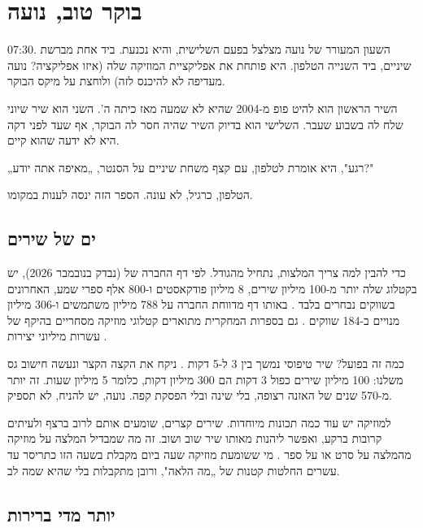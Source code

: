 
\chapter{בוקר טוב, נועה}\label{ch:1}

\begin{scene}
07:30. השעון המעורר של נועה מצלצל בפעם השלישית, והיא נכנעת. ביד אחת מברשת שיניים, ביד השנייה הטלפון. היא פותחת את אפליקציית המוזיקה שלה (איזו אפליקציה? נועה מעדיפה לא להיכנס לזה) ולוחצת על מיקס הבוקר.

השיר הראשון הוא להיט פופ מ-2004 שהיא לא שמעה מאז כיתה ה'. השני הוא שיר שיוני שלח לה בשבוע שעבר. השלישי הוא בדיוק השיר שהיה חסר לה הבוקר, אף שעד לפני דקה היא לא ידעה שהוא קיים.

„רגע", היא אומרת לטלפון, עם קצף משחת שיניים על הסנטר, „מאיפה אתה יודע?"

הטלפון, כרגיל, לא עונה. הספר הזה ינסה לענות במקומו.
\end{scene}

\section{ים של שירים}

כדי להבין למה צריך המלצות, נתחיל מהגודל. לפי דף החברה של  (נבדק בנובמבר 2026), יש בקטלוג שלה יותר מ-100 מיליון שירים, 8 מיליון פודקאסטים ו-800 אלף ספרי שמע, האחרונים בשווקים נבחרים בלבד \cite{spotify2026company}. באותו דף מדווחת החברה על 788 מיליון משתמשים ו-306 מיליון מנויים ב-184 שווקים \cite{spotify2026company}. גם בספרות המחקרית מתוארים קטלוגי מוזיקה מסחריים בהיקף של עשרות מיליוני יצירות \cite{schedl2018current}.

כמה זה בפועל? שיר טיפוסי נמשך בין 3 ל-5 דקות \cite{schedl2018current}. ניקח את הקצה הקצר ונעשה חישוב גס משלנו: 100 מיליון שירים כפול 3 דקות הם 300 מיליון דקות, כלומר 5 מיליון שעות. זה יותר מ-570 שנים של האזנה רצופה, בלי שינה ובלי הפסקת קפה. נועה, יש להניח, לא תספיק.

למוזיקה יש עוד כמה תכונות מיוחדות. שירים קצרים, שומעים אותם לרוב ברצף ולעיתים קרובות ברקע, ואפשר ליהנות מאותו שיר שוב ושוב. זה מה שמבדיל המלצה על מוזיקה מהמלצה על סרט או על ספר \cite{schedl2018current}. מי ששומעת מוזיקה שעה ביום מקבלת בשעה הזו כתריסר עד עשרים החלטות קטנות של „מה הלאה", ורובן מתקבלות בלי שהיא שמה לב.

\section{יותר מדי ברירות}

